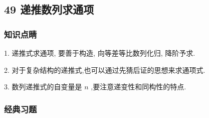 \subsection*{49 递推数列求通项}

\subsubsection*{知识点睛}

1. 递推式求通项, 要善于构造, 向等差等比数列化归, 降阶予求.

2. 对于复杂结构的递推式,也可以通过先猜后证的思想来求通项式.

3. 数列递推式的自变量是 $n$ ,要注意递变性和同构性的特点.

\subsubsection*{经典习题}

